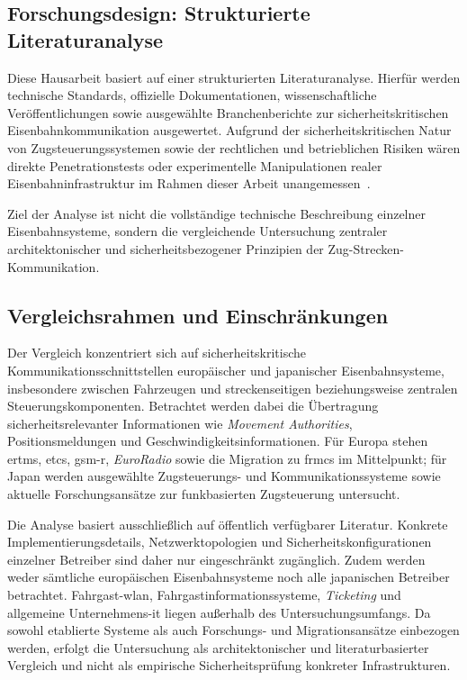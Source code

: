 \documentclass[runningheads]{res/llncs}
\begin{document}
\subsection{Forschungsdesign: Strukturierte Literaturanalyse}
\label{sec:Forschungsdesign_Strukturierte_Literaturanalyse}

Diese Hausarbeit basiert auf einer strukturierten Literaturanalyse. Hierfür werden technische Standards, offizielle Dokumentationen, wissenschaftliche Veröffentlichungen sowie ausgewählte Branchenberichte zur sicherheitskritischen Eisenbahnkommunikation ausgewertet. Aufgrund der sicherheitskritischen Natur von Zugsteuerungssystemen sowie der rechtlichen und betrieblichen Risiken wären direkte Penetrationstests oder experimentelle Manipulationen realer Eisenbahninfrastruktur im Rahmen dieser Arbeit unangemessen~\cite{Chothia2017}.

Ziel der Analyse ist nicht die vollständige technische Beschreibung einzelner Eisenbahnsysteme, sondern die vergleichende Untersuchung zentraler architektonischer und sicherheitsbezogener Prinzipien der Zug-Strecken-Kommunikation.

\subsection{Vergleichsrahmen und Einschränkungen}
\label{sec:Vergleichsrahmen_und_Einschränkungen}

Der Vergleich konzentriert sich auf sicherheitskritische Kommunikationsschnittstellen europäischer und japanischer Eisenbahnsysteme, insbesondere zwischen Fahrzeugen und streckenseitigen beziehungsweise zentralen Steuerungskomponenten. Betrachtet werden dabei die Übertragung sicherheitsrelevanter Informationen wie \textit{Movement Authorities}, Positionsmeldungen und Geschwindigkeitsinformationen. Für Europa stehen \gls{ertms}, \gls{etcs}, \gls{gsm-r}, \textit{EuroRadio} sowie die Migration zu \gls{frmcs} im Mittelpunkt; für Japan werden ausgewählte Zugsteuerungs- und Kommunikationssysteme sowie aktuelle Forschungsansätze zur funkbasierten Zugsteuerung untersucht.

Die Analyse basiert ausschließlich auf öffentlich verfügbarer Literatur. Konkrete Implementierungsdetails, Netzwerktopologien und Sicherheitskonfigurationen einzelner Betreiber sind daher nur eingeschränkt zugänglich. Zudem werden weder sämtliche europäischen Eisenbahnsysteme noch alle japanischen Betreiber betrachtet. Fahrgast-\gls{wlan}, Fahrgastinformationssysteme, \textit{Ticketing} und allgemeine Unternehmens-\gls{it} liegen außerhalb des Untersuchungsumfangs. Da sowohl etablierte Systeme als auch Forschungs- und Migrationsansätze einbezogen werden, erfolgt die Untersuchung als architektonischer und literaturbasierter Vergleich und nicht als empirische Sicherheitsprüfung konkreter Infrastrukturen.
\end{document}
